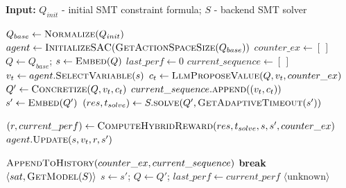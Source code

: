 \begin{algorithm}[!t]
\caption{The COMPASS Simplification Algorithm with Performance-Monitored Exploration}
\label{alg:main}
\raggedright\textbf{Input:} $Q_{init}$ - initial SMT constraint formula; $S$ - backend SMT solver
\begin{algorithmic}[1]
    \State $Q_{base} \gets \Call{Normalize}{Q_{init}}$ \label{alg:line:normalize}
    \State $agent \gets \Call{InitializeSAC}{\Call{GetActionSpaceSize}{Q_{base}}}$
    \State $counter\_ex \gets [\,]$  \label{alg:line:init-history}
      \label{alg:line:outer-loop}
        \State $Q \gets Q_{base}$; $s \gets \Call{Embed}{Q}$ \label{alg:line:trial-reset}
        \State $last\_perf \gets 0$  \label{alg:line:perf-init}
        \State $current\_sequence \gets [\,]$
          \label{alg:line:inner-loop}
            \State $v_t \gets agent.\Call{SelectVariable}{s}$ \label{alg:line:select-var}
            \State $c_t \gets \Call{LlmProposeValue}{Q, v_t, counter\_ex}$ \label{alg:line:propose-val}
            \State $Q' \gets \Call{Concretize}{Q, v_t, c_t}$
            \State $current\_sequence.\Call{append}{(v_t, c_t)}$
            \State $s' \gets \Call{Embed}{Q'}$ \label{alg:line:embed-next}
            \State $(res, t_{solve}) \gets S.\Call{solve}{Q', \Call{GetAdaptiveTimeout}{s'}}$
            
            \State $(r, current\_perf) \gets \Call{ComputeHybridReward}{res, t_{solve}, s, s', counter\_ex}$ \label{alg:line:compute-reward}
            \State $agent.\Call{Update}{s, v_t, r, s'}$
            
             \label{alg:line:reset-cond}
                \State $\Call{AppendToHistory}{counter\_ex, current\_sequence}$  \label{alg:line:add-history}
                \State \textbf{break} 
                \State \Return $\langle \texttt{sat}, \Call{GetModel}{S} \rangle$
            \EndIf
            \State $s \gets s'$; $Q \gets Q'$; $last\_perf \gets current\_perf$  \label{alg:line:advance-state}
        \EndWhile
    \EndWhile
    \State \Return $\langle \text{unknown} \rangle$
\EndProcedure
\end{algorithmic}
\end{algorithm}

